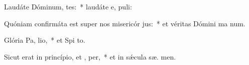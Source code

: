 \item Laudáte Dóminum,  tes:~* laudáte e,  puli:
\item Quóniam confirmáta est super nos misericór jus:~* et véritas Dómini ma  num.
\item Glória Pa,  lio,~* et Spi to.
\item Sicut erat in princípio, et ,  per,~* et in sǽcula sæ. men.
